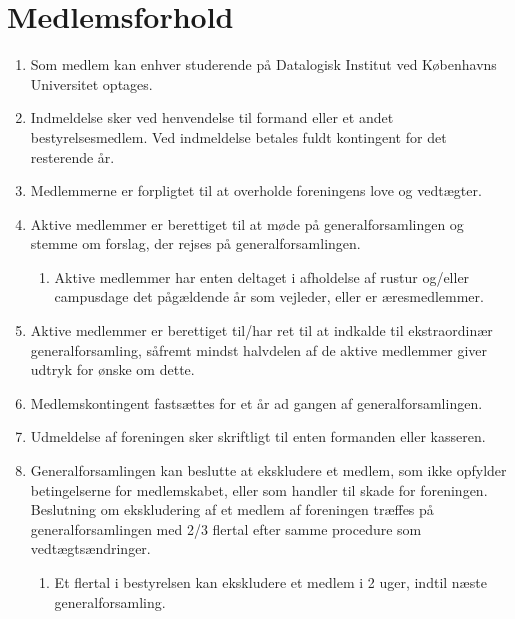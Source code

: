 \documentclass[a4paper, 10pt]{article}
\renewcommand\thesection{\textsection\arabic{section}}
\newenvironment{stykenum}{
  \begin{enumerate}[%
    label=Stk.~\arabic*:, ref=\textsection~\theenumi~Stk.~\arabic*, start=1]
}{\end{enumerate}}
\newenvironment{substykenum}{
  \begin{enumerate}[%
          label=Stk.~\arabic{enumi}.\arabic*:,
      ref=\thesection~Stk.~\arabic{enumi}.\arabic*, start=1]
}{\end{enumerate}}
\begin{document}
\section{Medlemsforhold}
\begin{stykenum}
    \item Som medlem kan enhver studerende på Datalogisk Institut ved Københavns
        Universitet optages.

    \item Indmeldelse sker ved henvendelse til formand eller et andet
        bestyrelsesmedlem. Ved indmeldelse betales fuldt kontingent for det
        resterende år.

    \item Medlemmerne er forpligtet til at overholde foreningens love og
        vedtægter.

    \item Aktive medlemmer er berettiget til at møde på generalforsamlingen og
        stemme om forslag, der rejses på generalforsamlingen.
        \begin{substykenum}
            \item Aktive medlemmer har enten deltaget i afholdelse af rustur
                og/eller campusdage det pågældende år som vejleder, eller er
                æresmedlemmer.
        \end{substykenum}

    \item Aktive medlemmer  er berettiget til/har ret til at indkalde til
        ekstraordinær generalforsamling, såfremt mindst halvdelen af de aktive
        medlemmer giver udtryk for ønske om dette.

    \item Medlemskontingent fastsættes for et år ad gangen af
        generalforsamlingen.

    \item Udmeldelse af foreningen sker skriftligt til enten formanden eller
        kasseren.

    \item Generalforsamlingen kan beslutte at ekskludere et medlem, som ikke
        opfylder betingelserne for medlemskabet, eller som handler til skade for
        foreningen. Beslutning om ekskludering af et medlem af foreningen
        træffes på generalforsamlingen med 2/3 flertal efter samme procedure som
        vedtægtsændringer.
        \begin{substykenum}
        \item Et flertal i bestyrelsen kan ekskludere et medlem i 2 uger, indtil
            næste  generalforsamling.
        \end{substykenum}


\end{stykenum}
\end{document}
